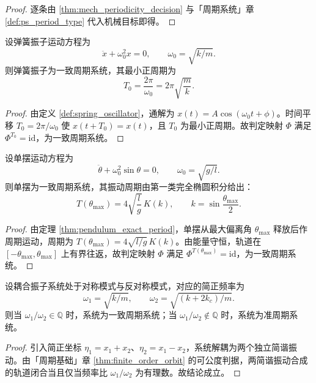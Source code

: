 \begin{proof}
逐条由 \cref{thm:mech_periodicity_decision} 与「周期系统」章 \cref{def:ps_period_type} 代入机械目标即得。
\end{proof}

\begin{lemma}[弹簧振子的周期判定]\label{lem:spring_periodic}
设弹簧振子运动方程为
\[
\ddot x+\omega_0^2x=0,\qquad \omega_0=\sqrt{k/m}.
\]
则弹簧振子为一致周期系统，其最小正周期为
\[
T_0=\frac{2\pi}{\omega_0}=2\pi\sqrt{\frac{m}{k}}.
\]
\end{lemma}

\begin{proof}
由定义 \ref{def:spring_oscillator}，通解为 $x(t)=A\cos(\omega_0t+\phi)$。时间平移 $T_0=2\pi/\omega_0$ 使 $x(t+T_0)=x(t)$，且 $T_0$ 为最小正周期。故判定映射 $\Phi$ 满足 $\Phi^{T_0}=\mathrm{id}$，为一致周期系统。
\end{proof}

\begin{lemma}[单摆的周期判定]\label{lem:pendulum_periodic}
设单摆运动方程为
\[
\ddot\theta+\omega_0^2\sin\theta=0,\qquad \omega_0=\sqrt{g/l}.
\]
则单摆为一致周期系统，其振动周期由第一类完全椭圆积分给出：
\[
T(\theta_{\max})=4\sqrt{\frac{l}{g}}\,K(k),\qquad k=\sin\frac{\theta_{\max}}{2}.
\]
\end{lemma}

\begin{proof}
由定理 \ref{thm:pendulum_exact_period}，单摆从最大偏离角 $\theta_{\max}$ 释放后作周期运动，周期为 $T(\theta_{\max})=4\sqrt{l/g}\,K(k)$。由能量守恒，轨道在 $[-\theta_{\max},\theta_{\max}]$ 上有界往返，故判定映射 $\Phi$ 满足 $\Phi^{T(\theta_{\max})}=\mathrm{id}$，为一致周期系统。
\end{proof}

\begin{lemma}[耦合振子的周期判定]\label{lem:coupled_periodic}
设耦合振子系统处于对称模式与反对称模式，对应的简正频率为
\[
\omega_1=\sqrt{k/m},\qquad \omega_2=\sqrt{(k+2k_c)/m}.
\]
则当 $\omega_1/\omega_2\in\mathbb Q$ 时，系统为一致周期系统；当 $\omega_1/\omega_2\notin\mathbb Q$ 时，系统为准周期系统。
\end{lemma}

\begin{proof}
引入简正坐标 $\eta_1=x_1+x_2$、$\eta_2=x_1-x_2$，系统解耦为两个独立简谐振动。由「周期基础」章 \cref{thm:finite_order_orbit} 的可公度判据，两简谐振动合成的轨道闭合当且仅当频率比 $\omega_1/\omega_2$ 为有理数。故结论成立。
\end{proof}


